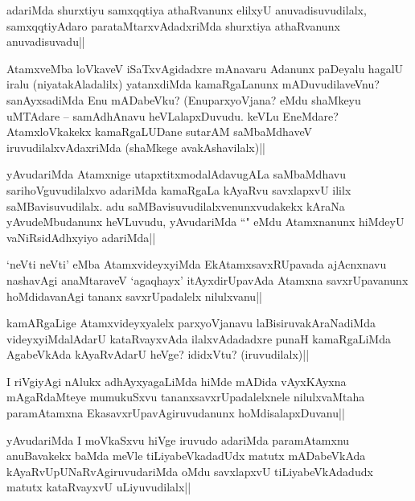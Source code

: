 \begin{artha}
adariMda shurxtiyu samxqqtiya athaRvanunx elilxyU anuvadisuvudilalx, samxqqtiyAdaro parataMtarxvAdadxriMda shurxtiya athaRvanunx anuvadisuvadu||
\end{artha}


\begin{artha}
AtamxveMba loVkaveV iSaTxvAgidadxre mAnavaru Adanunx paDeyalu hagalU iralu (niyatakAladalilx) yatanxdiMda kamaRgaLanunx mADuvudilaveVnu? sanAyxsadiMda Enu mADabeVku? (EnuparxyoVjana? eMdu shaMkeyu uMTAdare -- samAdhAnavu heVLalapxDuvudu. keVLu EneMdare? AtamxloVkakekx kamaRgaLUDane sutarAM saMbaMdhaveV iruvudilalxvAdaxriMda (shaMkege avakAshavilalx)||
\end{artha}


\begin{artha}
yAvudariMda Atamxnige utapxtitxmodalAdavugALa saMbaMdhavu sarihoVguvudilalxvo adariMda kamaRgaLa kAyaRvu savxlapxvU ililx saMBavisuvudilalx. adu saMBavisuvudilalxvenunxvudakekx kAraNa yAvudeMbudanunx heVLuvudu, yAvudariMda ``\stext" eMdu Atamxnanunx hiMdeyU vaNiRsidAdhxyiyo adariMda||
\end{artha}

\begin{artha}
`neVti neVti' eMba AtamxvideyxyiMda EkAtamxsavxRUpavada ajAcnxnavu nashavAgi anaMtaraveV `agaqhayx' itAyxdirUpavAda Atamxna savxrUpavanunx hoMdidavanAgi tananx savxrUpadalelx nilulxvanu||
\end{artha}


\begin{artha}
kamARgaLige Atamxvideyxyalelx parxyoVjanavu laBisiruvakAraNadiMda videyxyiMdalAdarU kataRvayxvAda ilalxvAdadadxre punaH kamaRgaLiMda AgabeVkAda kAyaRvAdarU heVge? ididxVtu? (iruvudilalx)||
\end{artha}

\begin{artha}
I riVgiyAgi nAlukx adhAyxyagaLiMda hiMde mADida vAyxKAyxna mAgaRdaMteye mumukuSxvu tananxsavxrUpadalelxnele nilulxvaMtaha paramAtamxna EkasavxrUpavAgiruvudanunx hoMdisalapxDuvanu||
\end{artha}

\begin{artha}
yAvudariMda I moVkaSxvu hiVge iruvudo adariMda paramAtamxnu anuBavakekx baMda meVle tiLiyabeVkadadUdx matutx mADabeVkAda kAyaRvUpUNaRvAgiruvudariMda  oMdu savxlapxvU tiLiyabeVkAdadudx matutx kataRvayxvU uLiyuvudilalx||
\end{artha}

